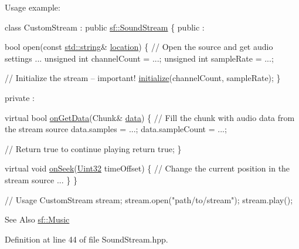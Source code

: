 Usage example\-: 
\begin{DoxyCode}
\textcolor{keyword}{class }CustomStream : \textcolor{keyword}{public} \hyperlink{classsf_1_1_sound_stream}{sf::SoundStream}
\{
\textcolor{keyword}{public} :

    \textcolor{keywordtype}{bool} open(\textcolor{keyword}{const} \hyperlink{gl3_8h_ac83513893df92266f79a515488701770}{std::string}& \hyperlink{gl3_8h_a6f0165ed903f22b8bb600c3e0b628e73}{location})
    \{
        \textcolor{comment}{// Open the source and get audio settings}
        ...
        \textcolor{keywordtype}{unsigned} \textcolor{keywordtype}{int} channelCount = ...;
        \textcolor{keywordtype}{unsigned} \textcolor{keywordtype}{int} sampleRate = ...;

        \textcolor{comment}{// Initialize the stream -- important!}
        \hyperlink{classsf_1_1_sound_stream_a9c351711198ee1aa77c2fefd3ced4d2c}{initialize}(channelCount, sampleRate);
    \}

\textcolor{keyword}{private} :

    \textcolor{keyword}{virtual} \textcolor{keywordtype}{bool} \hyperlink{classsf_1_1_sound_stream_a968ec024a6e45490962c8a1121cb7c5f}{onGetData}(Chunk& \hyperlink{gl3_8h_a0f78eecb0891cce3bdfc815b971866a1}{data})
    \{
        \textcolor{comment}{// Fill the chunk with audio data from the stream source}
        data.samples = ...;
        data.sampleCount = ...;

        \textcolor{comment}{// Return true to continue playing}
        \textcolor{keywordflow}{return} \textcolor{keyword}{true};
    \}

    \textcolor{keyword}{virtual} \textcolor{keywordtype}{void} \hyperlink{classsf_1_1_sound_stream_a907036dd2ca7d3af5ead316e54b75997}{onSeek}(\hyperlink{namespacesf_aa746fb1ddef4410bddf198ebb27e727c}{Uint32} timeOffset)
    \{
        \textcolor{comment}{// Change the current position in the stream source}
        ...
    \}
\}

\textcolor{comment}{// Usage}
CustomStream stream;
stream.open(\textcolor{stringliteral}{"path/to/stream"});
stream.play();
\end{DoxyCode}


\begin{DoxySeeAlso}{See Also}
\hyperlink{classsf_1_1_music}{sf\-::\-Music} 
\end{DoxySeeAlso}


Definition at line 44 of file Sound\-Stream.\-hpp.



